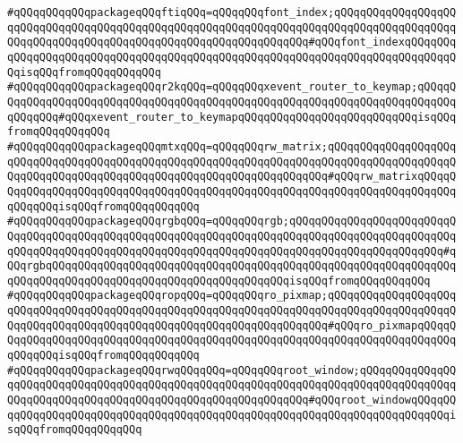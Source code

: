 \verb|#qQQqqQQqqQQqpackageqQQqftiqQQq=qQQqqQQqfont_index;qQQqqQQqqQQqqQQqqQQqqQQqqQQqqQQqqQQqqQQqqQQqqQQqqQQqqQQqqQQqqQQqqQQqqQQqqQQqqQQqqQQqqQQqqQQqqQQqqQQqqQQqqQQqqQQqqQQqqQQqqQQqqQQqqQQqqQQq#qQQqfont_indexqQQqqQQqqQQqqQQqqQQqqQQqqQQqqQQqqQQqqQQqqQQqqQQqqQQqqQQqqQQqqQQqqQQqqQQqqQQqqQQqisqQQqfromqQQqqQQqqQQq|\newline
\verb|#qQQqqQQqqQQqpackageqQQqr2kqQQq=qQQqqQQqxevent_router_to_keymap;qQQqqQQqqQQqqQQqqQQqqQQqqQQqqQQqqQQqqQQqqQQqqQQqqQQqqQQqqQQqqQQqqQQqqQQqqQQqqQQqqQQq#qQQqxevent_router_to_keymapqQQqqQQqqQQqqQQqqQQqqQQqqQQqisqQQqfromqQQqqQQqqQQq|\newline
\verb|#qQQqqQQqqQQqpackageqQQqmtxqQQq=qQQqqQQqrw_matrix;qQQqqQQqqQQqqQQqqQQqqQQqqQQqqQQqqQQqqQQqqQQqqQQqqQQqqQQqqQQqqQQqqQQqqQQqqQQqqQQqqQQqqQQqqQQqqQQqqQQqqQQqqQQqqQQqqQQqqQQqqQQqqQQqqQQqqQQqqQQq#qQQqrw_matrixqQQqqQQqqQQqqQQqqQQqqQQqqQQqqQQqqQQqqQQqqQQqqQQqqQQqqQQqqQQqqQQqqQQqqQQqqQQqqQQqqQQqisqQQqfromqQQqqQQqqQQq|\newline
\verb|#qQQqqQQqqQQqpackageqQQqrgbqQQq=qQQqqQQqrgb;qQQqqQQqqQQqqQQqqQQqqQQqqQQqqQQqqQQqqQQqqQQqqQQqqQQqqQQqqQQqqQQqqQQqqQQqqQQqqQQqqQQqqQQqqQQqqQQqqQQqqQQqqQQqqQQqqQQqqQQqqQQqqQQqqQQqqQQqqQQqqQQqqQQqqQQqqQQqqQQqqQQq#qQQqrgbqQQqqQQqqQQqqQQqqQQqqQQqqQQqqQQqqQQqqQQqqQQqqQQqqQQqqQQqqQQqqQQqqQQqqQQqqQQqqQQqqQQqqQQqqQQqqQQqqQQqqQQqqQQqisqQQqfromqQQqqQQqqQQq|\newline
\verb|#qQQqqQQqqQQqpackageqQQqropqQQq=qQQqqQQqro_pixmap;qQQqqQQqqQQqqQQqqQQqqQQqqQQqqQQqqQQqqQQqqQQqqQQqqQQqqQQqqQQqqQQqqQQqqQQqqQQqqQQqqQQqqQQqqQQqqQQqqQQqqQQqqQQqqQQqqQQqqQQqqQQqqQQqqQQqqQQqqQQq#qQQqro_pixmapqQQqqQQqqQQqqQQqqQQqqQQqqQQqqQQqqQQqqQQqqQQqqQQqqQQqqQQqqQQqqQQqqQQqqQQqqQQqqQQqqQQqisqQQqfromqQQqqQQqqQQq|\newline
\verb|#qQQqqQQqqQQqpackageqQQqrwqQQqqQQq=qQQqqQQqroot_window;qQQqqQQqqQQqqQQqqQQqqQQqqQQqqQQqqQQqqQQqqQQqqQQqqQQqqQQqqQQqqQQqqQQqqQQqqQQqqQQqqQQqqQQqqQQqqQQqqQQqqQQqqQQqqQQqqQQqqQQqqQQqqQQqqQQq#qQQqroot_windowqQQqqQQqqQQqqQQqqQQqqQQqqQQqqQQqqQQqqQQqqQQqqQQqqQQqqQQqqQQqqQQqqQQqqQQqqQQqisqQQqfromqQQqqQQqqQQq|\newline
